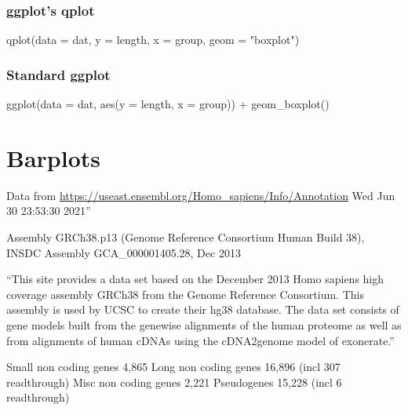 \documentclass[
]{book}
\newenvironment{Shaded}{\begin{snugshade}}{\end{snugshade}}
\newcommand{\AttributeTok}[1]{\textcolor[rgb]{0.77,0.63,0.00}{#1}}
\newcommand{\FunctionTok}[1]{\textcolor[rgb]{0.00,0.00,0.00}{#1}}
\newcommand{\NormalTok}[1]{#1}
\newcommand{\SpecialCharTok}[1]{\textcolor[rgb]{0.00,0.00,0.00}{#1}}
\newcommand{\StringTok}[1]{\textcolor[rgb]{0.31,0.60,0.02}{#1}}
\begin{document}
\hypertarget{ggplots-qplot-1}{%
\subsection{ggplot's qplot}\label{ggplots-qplot-1}}

\begin{Shaded}
\begin{Highlighting}[]
\FunctionTok{qplot}\NormalTok{(}\AttributeTok{data =}\NormalTok{ dat,}
      \AttributeTok{y =}\NormalTok{ length,}
      \AttributeTok{x =}\NormalTok{ group,}
      \AttributeTok{geom =} \StringTok{"boxplot"}\NormalTok{)}
\end{Highlighting}
\end{Shaded}

\hypertarget{standard-ggplot-1}{%
\subsection{Standard ggplot}\label{standard-ggplot-1}}

\begin{Shaded}
\begin{Highlighting}[]
\FunctionTok{ggplot}\NormalTok{(}\AttributeTok{data =}\NormalTok{ dat,}
      \FunctionTok{aes}\NormalTok{(}\AttributeTok{y =}\NormalTok{ length,}
      \AttributeTok{x =}\NormalTok{ group)) }\SpecialCharTok{+}
        \FunctionTok{geom\_boxplot}\NormalTok{()}
\end{Highlighting}
\end{Shaded}

\hypertarget{barplots}{%
\chapter{Barplots}\label{barplots}}

Data from \url{https://useast.ensembl.org/Homo_sapiens/Info/Annotation}
Wed Jun 30 23:53:30 2021''

Assembly GRCh38.p13 (Genome Reference Consortium Human Build 38), INSDC Assembly GCA\_000001405.28, Dec 2013

``This site provides a data set based on the December 2013 Homo sapiens high coverage assembly GRCh38 from the Genome Reference Consortium. This assembly is used by UCSC to create their hg38 database. The data set consists of gene models built from the genewise alignments of the human proteome as well as from alignments of human cDNAs using the cDNA2genome model of exonerate.''

Small non coding genes 4,865
Long non coding genes 16,896 (incl 307 readthrough)
Misc non coding genes 2,221
Pseudogenes 15,228 (incl 6 readthrough)
\end{document}

